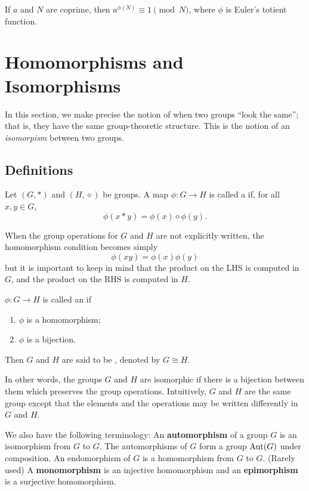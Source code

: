 \begin{theorem}
If $a$ and $N$ are coprime, then $a^{\phi(N)}\equiv1\pmod N$, where $\phi$ is Euler's totient function.
\end{theorem}

\section{Homomorphisms and Isomorphisms}
In this section, we make precise the notion of when two groups ``look the same''; that is, they have the same group-theoretic structure. This is the notion of an \emph{isomorpism} between two groups.

\subsection{Definitions}
\begin{definition}[Homomorphism]
Let $(G,\ast)$ and $(H,\diamond)$ be groups. A map $\phi:G\to H$ is called a  if, for all $x,y\in G$,
\[\phi(x\ast y)=\phi(x)\diamond\phi(y).\]
\end{definition}

When the group operations for $G$ and $H$ are not explicitly written, the homomorphism condition becomes simply
\[\phi(xy)=\phi(x)\phi(y)\]
but it is important to keep in mind that the product on the LHS is computed in $G$, and the product on the RHS is computed in $H$.

\begin{definition}[Isomorphism]
$\phi:G\to H$ is called an  if
\begin{enumerate}[label=(\roman*)]
\item $\phi$ is a homomorphism;
\item $\phi$ is a bijection.
\end{enumerate}
Then $G$ and $H$ are said to be , denoted by $G\cong H$.
\end{definition}

In other words, the groups $G$ and $H$ are isomorphic if there is a bijection between them which preserves the group operations. Intuitively, $G$ and $H$ are the same group except that the elements and the operations may be written differently in $G$ and $H$.

We also have the following terminology: An \textbf{automorphism} of a group $G$ is an isomorphism from $G$ to $G$. The automorphisms of $G$ form a group $\operatorname{Aut}(G)$ under composition. An endomorphism of $G$ is a homomorphism from $G$ to $G$. (Rarely used) A \textbf{monomorphism} is an injective homomorphism and an \textbf{epimorphism} is a surjective homomorphism.

